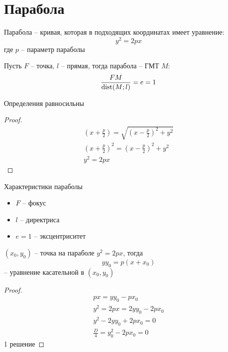\documentclass[main]{subfiles}
\begin{document}
\chapter{Парабола}
\begin{definition}
    Парабола -- кривая, которая в подходящих координатах имеет уравнение:
    \[y^2=2px\]
    где $p$ -- параметр параболы
\end{definition}
\begin{definition}
    Пусть $F$ -- точка, $l$ -- прямая, тогда парабола -- ГМТ $M$:
    \[\frac{FM}{\operatorname{dist}(M;l)} = e = 1\]
\end{definition}
\begin{theorem}
    Определения равносильны
\end{theorem}
\begin{proof}
    \begin{gather*}
        \left(x + \frac{p}{2}\right) = \sqrt{\left(x-\frac{p}{2}\right)^2 + y^2}\\
        \left(x + \frac{p}{2}\right)^2 = \left(x-\frac{p}{2}\right)^2 + y^2\\
        y^2 = 2px
    \end{gather*}
\end{proof}

Характеристики параболы
\begin{itemize}
    \item $F$ -- фокус
    \item $l$ -- директриса
    \item $e=1$ -- эксцентриситет
\end{itemize}

\begin{theorem}
    $(x_0, y_0)$ -- точка на параболе $y^2=2px$, тогда
    \[yy_0 = p (x+x_0)\]
    -- уравнение касательной в $(x_0, y_0)$
\end{theorem}
\begin{proof}
    \begin{gather*}
        px = yy_0 - px_0\\
        y^2 = 2px = 2yy_0-2px_0\\
        y^2 - 2yy_0 + 2px_0 = 0\\
        \frac{D}{4} = y_0^2 - 2px_0 = 0
    \end{gather*}
    1 решение
\end{proof}
\begin{theorem}

\end{theorem}
\end{document}
